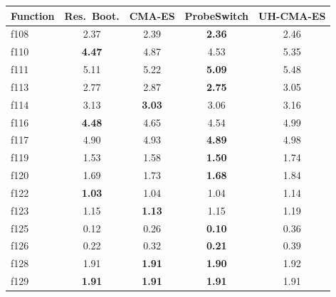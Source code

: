 \begin{tabular}{l cccc}
\toprule
Function & Res.~Boot. & CMA-ES & ProbeSwitch & UH-CMA-ES \\
\midrule
f108 & 2.37 & 2.39 & \textbf{2.36} & 2.46 \\
f110 & \textbf{4.47} & 4.87 & 4.53 & 5.35 \\
f111 & 5.11 & 5.22 & \textbf{5.09} & 5.48 \\
f113 & 2.77 & 2.87 & \textbf{2.75} & 3.05 \\
f114 & 3.13 & \textbf{3.03} & 3.06 & 3.16 \\
f116 & \textbf{4.48} & 4.65 & 4.54 & 4.99 \\
f117 & 4.90 & 4.93 & \textbf{4.89} & 4.98 \\
f119 & 1.53 & 1.58 & \textbf{1.50} & 1.74 \\
f120 & 1.69 & 1.73 & \textbf{1.68} & 1.84 \\
f122 & \textbf{1.03} & 1.04 & 1.04 & 1.14 \\
f123 & 1.15 & \textbf{1.13} & 1.15 & 1.19 \\
f125 & 0.12 & 0.26 & \textbf{0.10} & 0.36 \\
f126 & 0.22 & 0.32 & \textbf{0.21} & 0.39 \\
f128 & 1.91 & \textbf{1.91} & \textbf{1.90} & 1.92 \\
f129 & \textbf{1.91} & \textbf{1.91} & \textbf{1.91} & 1.91 \\
\bottomrule
\end{tabular}